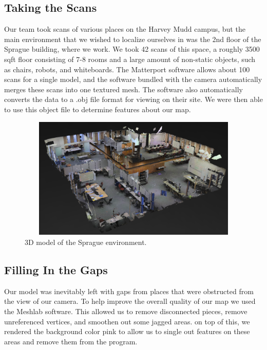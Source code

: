 \documentclass[a4paper,11pt]{article}
\begin{document}
  \subsection{Taking the Scans}
 Our team took scans of various places on the Harvey Mudd campus, but the main environment that we wished to localize ourselves in was the 2nd floor of the Sprague building, where we work. We took 42 scans of this space, a roughly 3500 sqft floor consisting of 7-8 rooms and a large amount of non-static objects, such as chairs, robots, and whiteboards. The Matterport software allows about 100 scans for a single model, and the software bundled with the camera automatically merges these scans into one textured mesh. The software also automatically converts the data to a .obj file format for viewing on their site. We were then able to use this object file to determine features about our map.

 \begin{figure}[h!]
   \centering
     \includegraphics[height=2.3in,width=5.5in,angle=0]{../Artifacts/rp1}
 \caption{3D model of the Sprague environment.}
\end{figure}

  \subsection{Filling In the Gaps}
  Our model was inevitably left with gaps from places that were obstructed from the view of our camera. To help improve the overall quality of our map we used the Meshlab software. This allowed us to remove disconnected pieces, remove unreferenced vertices, and smoothen out some jagged areas. on top of this, we rendered the background color pink to allow us to single out features on these areas and remove them from the program. 
  
\end{document}
